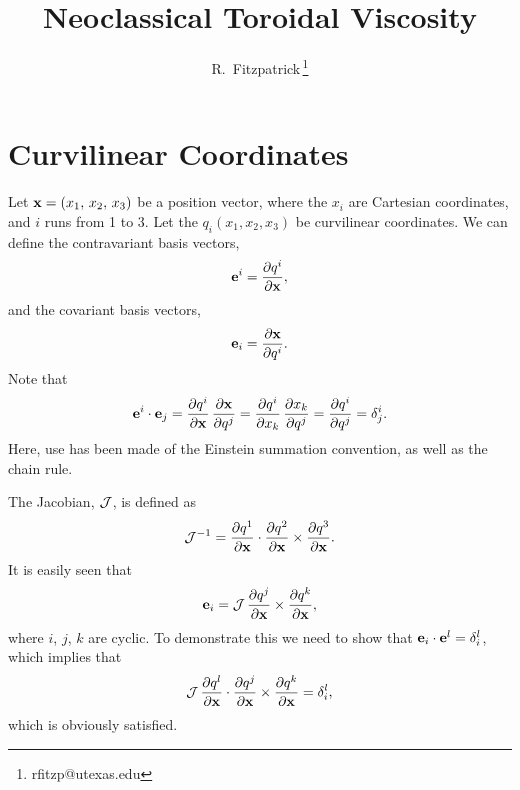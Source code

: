\documentclass[12pt,prb,aps,notitlepage]{revtex4-1}
\begin{document}
\title{Neoclassical Toroidal Viscosity}
\author{R.~Fitzpatrick\,\footnote{rfitzp@utexas.edu}}
\begin{abstract}
\end{abstract}
\maketitle

\section{Curvilinear Coordinates}
Let ${\bf x}=(x_1,\,x_2,\,x_3)$ be a position vector, where the $x_i$ are Cartesian coordinates, and $i$ runs from 1 to 3. 
Let the $q_i(x_1,x_2,x_3)$ be curvilinear coordinates. We can define the contravariant basis vectors,
\begin{equation}\label{e1}
{\bf e}^i = \frac{\partial q^i}{\partial {\bf x}},
\end{equation}
and the covariant basis vectors, 
\begin{equation}\label{e2}
{\bf e}_i = \frac{\partial {\bf x}}{\partial q^i}.
\end{equation}
Note that
\begin{equation}\label{e3}
{\bf e}^i\cdot{\bf e}_j = \frac{\partial q^i}{\partial {\bf x}}\,\frac{\partial {\bf x}}{\partial q^j}= \frac{\partial q^i}{\partial x_k}\,\frac{\partial x_k}{\partial q^j}=
\frac{\partial q^i}{\partial q^j} = \delta^i_j.
\end{equation}
Here, use has been made of the Einstein summation convention, as well as the chain rule. 

The Jacobian, ${\cal J}$,  is defined as
\begin{equation}
{\cal J}^{-1} = \frac{\partial q^1}{\partial {\bf x}}\cdot\frac{\partial q^2}{\partial{\bf x}}\times\frac{\partial q^3}{\partial{\bf x}}.
\end{equation}
It is easily seen that
\begin{equation}
{\bf e}_i = {\cal J}\,\frac{\partial q^j}{\partial {\bf x}}\times \frac{\partial{q^k}}{\partial{\bf x}},
\end{equation}
where $i$, $j$, $k$ are cyclic. To demonstrate this we need to show that ${\bf e}_i\cdot{\bf e}^l = \delta_i^l$, 
which implies that 
\begin{equation}
 {\cal J}\,\frac{\partial q^l}{\partial {\bf x}}\cdot\frac{\partial q^j}{\partial {\bf x}}\times \frac{\partial{q^k}}{\partial{\bf x}}= \delta_i^l,
 \end{equation}
 which is obviously satisfied. 
 
\end{document}
